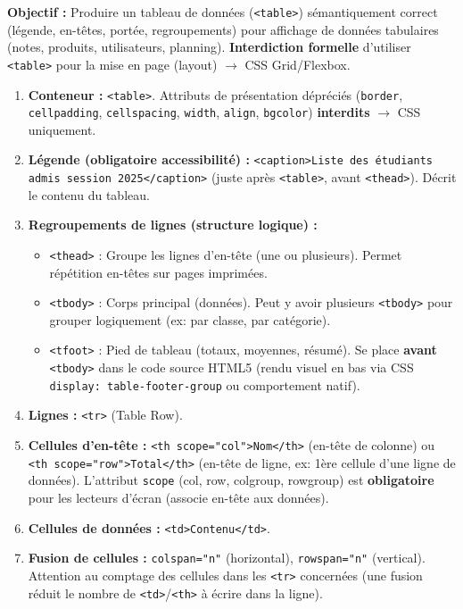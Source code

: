 \documentclass[11pt]{article}
\newcommand{\cle}[1]{{\popxbold\color{popdark}#1}}
\begin{document}
\begin{methode}
    \textbf{Objectif :} Produire un tableau de données (\texttt{<table>}) sémantiquement correct (légende, en-têtes, portée, regroupements) pour affichage de données tabulaires (notes, produits, utilisateurs, planning). \textbf{Interdiction formelle} d'utiliser \texttt{<table>} pour la mise en page (layout) $\rightarrow$ CSS Grid/Flexbox.
    \begin{enumerate}
        \item \textbf{Conteneur :} \texttt{<table>}. Attributs de présentation dépréciés (\texttt{border}, \texttt{cellpadding}, \texttt{cellspacing}, \texttt{width}, \texttt{align}, \texttt{bgcolor}) \textbf{interdits} $\rightarrow$ CSS uniquement.
        \item \textbf{Légende (obligatoire accessibilité) :} \texttt{<caption>Liste des étudiants admis session 2025</caption>} (juste après \texttt{<table>}, avant \texttt{<thead>}). Décrit le contenu du tableau.
        \item \textbf{Regroupements de lignes (structure logique) :}
              \begin{itemize}
                  \item \texttt{<thead>} : Groupe les lignes d'en-tête (une ou plusieurs). Permet répétition en-têtes sur pages imprimées.
                  \item \texttt{<tbody>} : Corps principal (données). Peut y avoir plusieurs \texttt{<tbody>} pour grouper logiquement (ex: par classe, par catégorie).
                  \item \texttt{<tfoot>} : Pied de tableau (totaux, moyennes, résumé). Se place \textbf{avant} \texttt{<tbody>} dans le code source HTML5 (rendu visuel en bas via CSS \texttt{display: table-footer-group} ou comportement natif).
              \end{itemize}
        \item \textbf{Lignes :} \texttt{<tr>} (Table Row).
        \item \textbf{Cellules d'en-tête :} \texttt{<th scope="col">Nom</th>} (en-tête de colonne) ou \texttt{<th scope="row">Total</th>} (en-tête de ligne, ex: 1ère cellule d'une ligne de données). L'attribut \texttt{scope} (\cle{col}, \cle{row}, \cle{colgroup}, \cle{rowgroup}) est \textbf{obligatoire} pour les lecteurs d'écran (associe en-tête aux données).
        \item \textbf{Cellules de données :} \texttt{<td>Contenu</td>}.
        \item \textbf{Fusion de cellules :} \texttt{colspan="n"} (horizontal), \texttt{rowspan="n"} (vertical). Attention au comptage des cellules dans les \texttt{<tr>} concernées (une fusion réduit le nombre de \texttt{<td>}/\texttt{<th>} à écrire dans la ligne).

\end{enumerate}
\end{methode}
\end{document}

